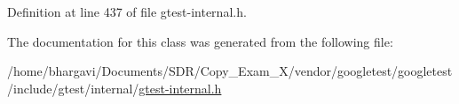 Definition at line 437 of file gtest-\/internal.\+h.



The documentation for this class was generated from the following file\+:\begin{DoxyCompactItemize}
\item 
/home/bhargavi/\+Documents/\+S\+D\+R/\+Copy\+\_\+\+Exam\+\_\+X/vendor/googletest/googletest/include/gtest/internal/\hyperlink{gtest-internal_8h}{gtest-\/internal.\+h}\end{DoxyCompactItemize}
